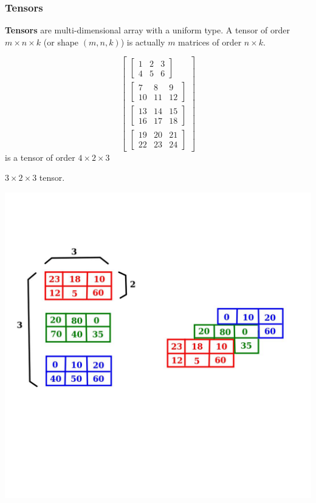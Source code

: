 \documentclass[12pt,aspectratio=169]{beamer}
\begin{document}
\begin{frame}
\frametitle{Tensors}
\textbf{Tensors} are multi-dimensional array with a uniform type. 
A tensor of order $m\times n\times k$ (or shape $(m,n,k)$) is actually $m$ matrices of order $n\times k$. 

\end{frame}

\begin{frame}
\[
\begin{bmatrix}
\begin{bmatrix}
1 & 2 & 3\\
4 & 5 & 6
\end{bmatrix}\\ 
\begin{bmatrix}
7 & 8 & 9\\
10 & 11 & 12
\end{bmatrix}\\ 
\begin{bmatrix}
13 & 14 & 15\\
16 & 17 & 18
\end{bmatrix}\\
\begin{bmatrix}
19 & 20 & 21\\
22 & 23 & 24
\end{bmatrix}
\end{bmatrix}
\]
is a tensor of order $4\times 2 \times 3$
\end{frame}

\begin{frame}
$3\times 2 \times 3$ tensor.
\begin{center}
\includegraphics[scale=0.3]{tensor}
\end{center}

\end{frame}
\end{document}
